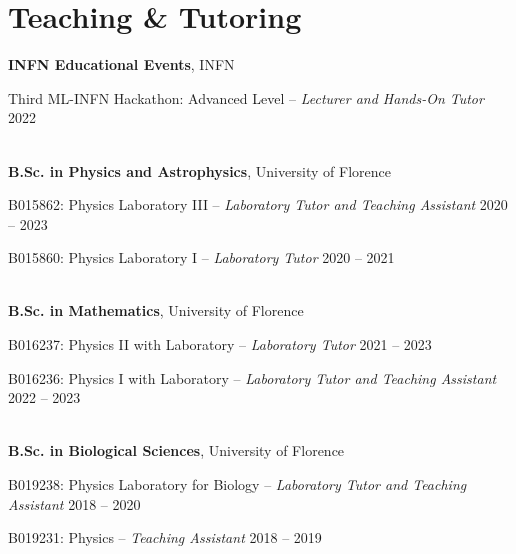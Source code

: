 \newcommand{\teaching}[2]
  {\normalsize \textbf{\color{hlcolor-0} #1}, {\color{hlcolor-1} #2}}
  
\newcommand{\teachclass}[3]
  {{\normalsize \color{maincolor} #1 --}
  {\small \color{maincolor} \emph{#2}} \hfill 
  {\normalsize \color{hlcolor-2} #3}}


\section*{Teaching \& Tutoring}
\begin{cvcontent}
  \teaching{INFN Educational Events}{INFN}
  \\ [1mm]
  \begin{itemize*}[label=\textcolor{iconcolor}{\textbullet}]
    \item \teachclass{Third ML-INFN Hackathon: Advanced Level}
      {Lecturer and Hands-On Tutor}{2022}
  \end{itemize*}
  \\ [4mm]
  \teaching{B.Sc. in Physics and Astrophysics}{University of Florence}
  \\ [1mm]
  \begin{itemize*}[label=\textcolor{iconcolor}{\textbullet}]
    \item \teachclass{B015862: Physics Laboratory III}
      {Laboratory Tutor and Teaching Assistant}{2020 -- 2023}\\ [0.5mm]
    \item \teachclass{B015860: Physics Laboratory I}
      {Laboratory Tutor}{2020 -- 2021}
  \end{itemize*}
  \\ [4mm]
  \teaching{B.Sc. in Mathematics}{University of Florence}
  \\ [1mm]
  \begin{itemize*}[label=\textcolor{iconcolor}{\textbullet}]
    \item \teachclass{B016237: Physics II with Laboratory}
      {Laboratory Tutor}{2021 -- 2023}\\ [0.5mm]
    \item \teachclass{B016236: Physics I with Laboratory}
      {Laboratory Tutor and Teaching Assistant}{2022 -- 2023}
  \end{itemize*}
  \\ [4mm]
  \teaching{B.Sc. in Biological Sciences}{University of Florence}
  \\ [1mm]
  \begin{itemize*}[label=\textcolor{iconcolor}{\textbullet}]
    \item \teachclass{B019238: Physics Laboratory for Biology}
      {Laboratory Tutor and Teaching Assistant}{2018 -- 2020}\\ [0.5mm]
    \item \teachclass{B019231: Physics}
      {Teaching Assistant}{2018 -- 2019}
  \end{itemize*}
\end{cvcontent}